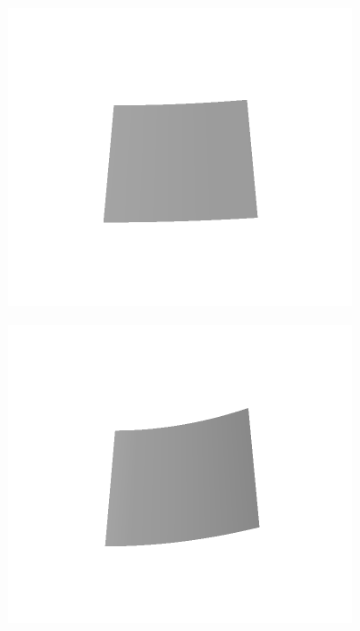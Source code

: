 \documentclass[../document.tex]{subfiles}
\begin{document}
\begin{figure}[htbp]
\begin{subfigure}[b]{0.24\textwidth}
    \includegraphics[width=\linewidth]{../img/5/custom_patches/ramp/all/03-3d.png}
    \end{subfigure}
    \begin{subfigure}[b]{0.24\textwidth}
    \includegraphics[width=\linewidth]{../img/5/custom_patches/ramp/all/06-3d.png}
    \end{subfigure}
    \begin{subfigure}[b]{0.24\textwidth}

\end{subfigure}
\end{figure}
\end{document}
